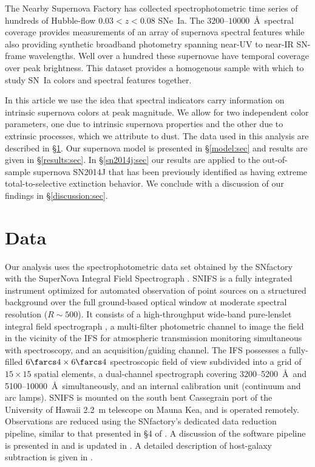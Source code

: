 \documentclass{aastex}   	%
\begin{document}
The Nearby Supernova Factory \citep[SNfactory;][]{2004SPIE.5249..146L} has collected  
spectrophotometric time series of hundreds of Hubble-flow $0.03<z<0.08$ SNe~Ia.   The $3200$--$10000$~\AA\ spectral coverage
provides measurements of an array of supernova spectral features while also providing synthetic broadband photometry
spanning near-UV to near-IR SN-frame wavelengths.  Well over a hundred these supernovae have temporal coverage over
peak brightness.  This dataset provides a homogenous sample with which to study SN~Ia colors and spectral features together.

In this article we use the idea that spectral indicators carry information on intrinsic supernova colors at peak magnitude.
We allow for two independent color parameters, one due to intrinsic supernova
properties and the other due to
extrinsic processes, which we attribute to dust.  The data used in this analysis are described in \S\ref{data:sec}.  Our supernova model is presented in
\S\ref{model:sec} and results are given in \S\ref{results:sec}.  In \S\ref{sn2014j:sec} our results are applied to the out-of-sample
supernova SN2014J that has been previously identified as having extreme total-to-selective extinction behavior.
We conclude with a discussion of our findings in \S\ref{discussion:sec}.


\section{Data}
\label{data:sec}

Our analysis uses the spectrophotometric data set obtained by
the SNfactory with the SuperNova Integral Field
Spectrograph \citep[SNIFS,][]{2004SPIE.5249..146L}.  SNIFS is a fully integrated
instrument optimized for automated observation of point sources on a
structured background over the full ground-based optical window at
moderate spectral resolution ($R \sim 500$).  It consists of a
high-throughput wide-band pure-lenslet integral field spectrograph
\citep[IFS, ``\`a la TIGER;''][]{1995A&AS..113..347B,2000ASPC..195..173B,2001MNRAS.326...23B}, a
multi-filter photometric channel to image the field in the vicinity of
the IFS for atmospheric transmission monitoring simultaneous with
spectroscopy, and an acquisition/guiding channel.  The IFS possesses a
fully-filled $6\farcs 4 \times 6\farcs 4$ spectroscopic field of view
subdivided into a grid of $15 \times 15$ spatial elements, a
dual-channel spectrograph covering 3200--5200~\AA\ and 5100--10000~\AA\
simultaneously, and an internal calibration unit (continuum and arc
lamps).  SNIFS is mounted on the south bent Cassegrain port of the
University of Hawaii 2.2~m telescope on Mauna Kea, and is operated
remotely.  Observations are reduced using the SNfactory's dedicated data
reduction pipeline, similar to that presented in \S4 of \citet{2001MNRAS.326...23B}.
A discussion of the software pipeline is presented in
\citet{2006ApJ...650..510A} and is updated in \citet{2010ApJ...713.1073S}.  A detailed
description of host-galaxy subtraction is given in \citet{2011MNRAS.418..258B}.
\end{document}
